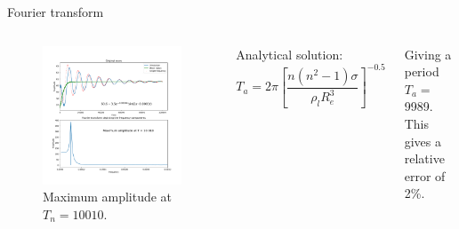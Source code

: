 \documentclass[8pt]{beamer}
\begin{document}
	\begin{frame}{Fourier transform}
		
		\begin{columns}
			
			\begin{figure}[h]
				\centering
				\includegraphics[width=1\linewidth]{pics/fourier.pdf}
				\caption{Maximum amplitude at $T_n = 10010$.}
				\label{fig:2cOsc}
			\end{figure}
			
			Analytical solution:
			\begin{equation}
			T_a = 2 \pi \left[ \frac{n (n^2-1) \sigma}{\rho_l R_e^3} \right]^{-0.5}
			\end{equation}
			
			Giving a period $T_a = $ 9989. This gives a relative error of 2\%. 
			
		\end{columns}
		
		
	\end{frame}
	
\end{document}
